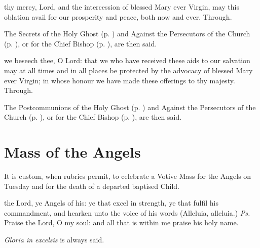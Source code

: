 \vspace{-1.5ex}

\secret
{} thy mercy, Lord, and the intercession of blessed Mary ever Virgin, may this oblation avail for our prosperity and peace, both now and ever. Through.
\begin{rubric}
    The Secrets of the Holy Ghost (p. \pageref{SPHolyGhost}) and Against the Persecutors of the Church (p. \pageref{SPAgainst}), or for the Chief Bishop (p. \pageref{SPChiefBishop}), are then said.
\end{rubric}

\vspace{-1.5ex}


\vspace{-2ex}

\postcommunion
{} we beseech thee, O Lord: that we who have received these aids to our salvation may at all times and in all places be protected by the advocacy of blessed Mary ever Virgin; in whose honour we have made these offerings to thy majesty. Through.
\begin{rubric}
    The Postcommunions of the Holy Ghost (p. \pageref{SPHolyGhost}) and Against the Persecutors of the Church (p. \pageref{SPAgainst}), or for the Chief Bishop (p. \pageref{SPChiefBishop}), are then said.
\end{rubric}

\clearpage

\section{Mass of the Angels}\label{MassOfTheAngels}
\fancyhead[RE,LO]{}
\begin{secrubric}
    It is custom, when rubrics permit, to celebrate a Votive Mass for the Angels on Tuesday and for the death of a departed baptised Child.
\end{secrubric}
 the Lord, ye Angels of his: ye that excel in strength, ye that fulfil his commandment, and hearken unto the voice of his words (Alleluia, alleluia.) \textit{Ps.} Praise the Lord, O my soul: and all that is within me praise his holy name.

\begin{rubric}
    \emph{Gloria in excelsis} is always said.
\end{rubric}

